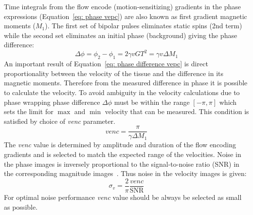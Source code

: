 Time integrals from the flow encode (motion-sensitizing) gradients in the phase expressions (Equation~\ref{eq: phase vepc}) are also known as first gradient magnetic moments ($M_1$). 
The first set of bipolar pulses eliminates static spins (2nd term) while the second set eliminates an initial phase (background) giving the phase difference:
\begin{equation}\label{eq: phase difference vepc}
\Delta\phi=\phi_2-\phi_1=2\gamma v G T^2=\gamma v \Delta M_1
\end{equation}
An important result of Equation~\ref{eq: phase difference vepc} is direct proportionality between the velocity of the tissue and the difference in its magnetic moments.
Therefore from the measured difference in phase it is possible to calculate the velocity.
To avoid ambiguity in the velocity calculations due to phase wrapping phase difference $\Delta\phi$ must be within the range $\left[ -\pi, \pi \right]$ which sets the limit for $\max$ and $\min$ velocity that can be measured.
This condition is satisfied by choice of \textit{venc} parameter.
\begin{equation}\label{eq: venc}
venc = \frac{\pi}{\gamma \Delta M_1}
\end{equation}
The \textit{venc} value is determined by amplitude and duration of the flow encoding gradients and is selected to match the expected range of the velocities. 
Noise in the phase images is inversely proportional to the signal-to-noise ratio (SNR) in the corresponding magnitude images~\cite{Pelc:1991vr}.
Thus noise in the velocity images is given:
\begin{equation}\label{eq: SNR}
\sigma_v = \frac{2}{\pi} \frac{venc}{\mathrm{SNR}}
\end{equation}
For optimal noise performance \textit{venc} value should be always be selected as small as possible.

